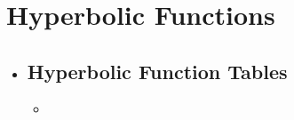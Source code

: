 \section{Hyperbolic Functions}
\begin{itemize}
  \item []

  \subsection{Hyperbolic Function Tables}
  \begin{itemize}
    \item 
  \end{itemize}
  
\end{itemize}




